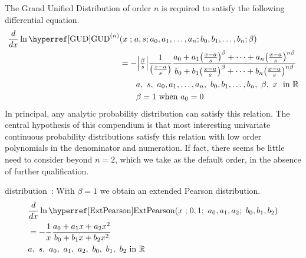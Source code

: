 

\label{sec:GUD}

The Grand Unified Distribution of order $n$ is required to satisfy the following differential equation.
\begin{align}
\label{GUD}
\frac{d}{dx} \ln  \opr{GUD}^{(n)}&(x\given a, s; a_0, a_1,\ldots,a_n;  b_0,b_1,\ldots, b_n; \beta)
\checked \\
&= -\Left|\tfrac{\beta}{s}\Right| \frac{1}{\bigl(\tfrac{x-a}{s}\bigr)} \frac{a_0  +a_1 \bigl(\tfrac{x-a}{s}\bigr)^{\beta}+\cdots +a_n \bigl(\tfrac{x-a}{s}\bigr)^{n\beta}}{b_0+ b_1 \bigl(\tfrac{x-a}{s}\bigr)^{\beta}+\cdots+b_n\bigl(\tfrac{x-a}{s}\bigr)^{n\beta}  } 
\notag
\checked
\\
& \qquad  a,\ s,\  a_0,a_1,\ldots,a_n,\ b_0,b_1, \ldots, b_n,\ \beta,\ x\  \text{ in } \mathbb{R} 
\checked
\notag
\\ \notag
& \qquad \beta = 1 \text{ when } a_0 =0
\checked
\end{align}
In principal, any analytic probability distribution can satisfy this relation.
The central hypothesis of this compendium is that most interesting univariate continuous probability distributions satisfy this relation with low order polynomials in the denominator and numeration. If fact, there seems be little need to consider beyond $n=2$, which we take as the default order, in the absence of further qualification. 




 distribution~\cite{Roy1971, Shakil2011}: With $\beta=1$ we obtain an extended Pearson distribution.
\begin{align}
\label{ExtPearson}
&\frac{d}{dx} \ln  \opr{ExtPearson}(x\given 0, 1;\ a_0, a_1, a_2;\ b_0, b_1, b_2) \checked \\
\notag
&= - \frac{1}{x} \frac{a_0 +a_1 x+ a_2 x^2}{b_0+ b_1 x+  b_2 x^2  } \\
\notag
& a,\ s,\ a_0,\ a_1,\ a_2,\ b_0,\ b_1,\ b_2 \text{ in } \Real
\end{align}



